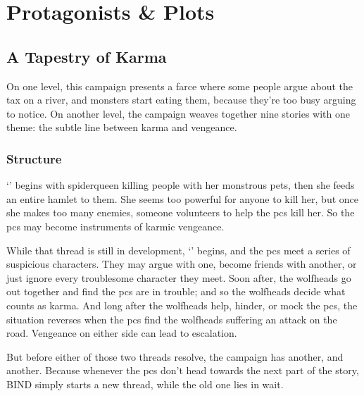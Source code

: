 \chapter{Protagonists \& Plots}
\label{sideQuestIntro}

\section{A Tapestry of Karma}
\label{sqSummaries}

\noindent
On one level, this \gls{campaign} presents a farce where some people argue about the tax on a river, and monsters start eating them, because they're too busy arguing to notice.
On another level, the \gls{campaign} weaves together nine stories with one theme: the subtle line between karma and vengeance.

\begin{multicols}{2}


\subsection{Structure}

`' begins with \gls{spiderqueen} killing people with her monstrous pets, then she feeds an entire hamlet to them.
She seems too powerful for anyone to kill her, but once she makes too many enemies, someone volunteers to help the \glspl{pc} kill her.
So the \glspl{pc} may become instruments of karmic vengeance.

While that thread is still in development, `' begins, and the \glspl{pc} meet a series of suspicious characters.
They may argue with one, become friends with another, or just ignore every troublesome character they meet.
Soon after, the \glspl{wolfhead} go out together and find the \glspl{pc} are in trouble; and so the \glspl{wolfhead} decide what counts as karma.
And long after the \glspl{wolfhead} help, hinder, or mock the \glspl{pc}, the situation reverses when the \glspl{pc} find the \glspl{wolfhead} suffering an attack on the road.
Vengeance on either side can lead to escalation.

But before either of those two threads resolve, the \gls{campaign} has another, and another.
Because whenever the \glspl{pc} don't head towards the next part of the story, BIND simply starts a new \gls{thread}, while the old one lies in wait.


\end{multicols}
